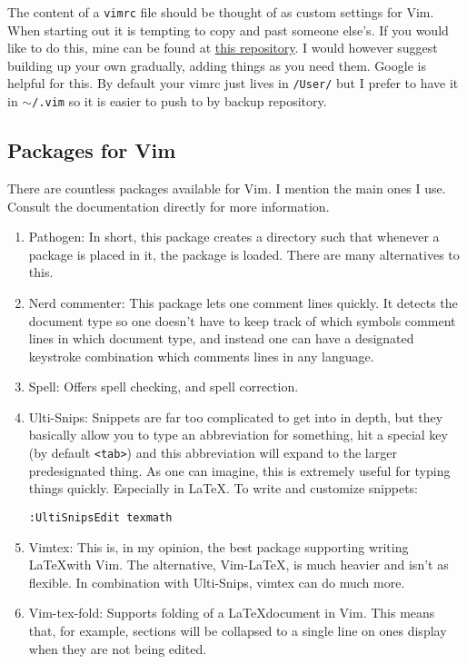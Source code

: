 \documentclass{amsart}
\begin{document}
The content of a \texttt{vimrc} file should be thought of as custom settings for Vim.
When starting out it is tempting to copy and past someone else's. If you would like to do
this, mine can be found at \href{https://github.com/jacksontvd/vim}{this repository}. I
would however suggest building up your own gradually, adding things as you need them.
Google is helpful for this. 
By default your vimrc just lives in \texttt{/User/} but I prefer to have it in 
$\sim$\texttt{/.vim} so it is easier to push to by backup repository.

\subsection{Packages for Vim}

There are countless packages available for Vim. I mention the main ones I use. Consult the
documentation directly for more information.
\begin{enumerate}
\item Pathogen: In short, this package creates a directory such that whenever a package is
placed in it, the package is loaded. There are many alternatives to this. 
\item Nerd commenter: This package lets one comment lines quickly. It detects the document
type so one doesn't have to keep track of which symbols comment lines in which document
type, and instead one can have a designated keystroke combination which comments lines in
any language. 
\item Spell: Offers spell checking, and spell correction.
\item Ulti-Snips: Snippets are far too complicated to get into in depth, but they
basically allow you to type an abbreviation for something, hit a special key (by default
\texttt{<tab>}) and this abbreviation will expand to the larger predesignated thing. As
one can imagine, this is extremely useful for typing things quickly. Especially in \LaTeX.
To write and customize snippets:
\begin{verbatim}
:UltiSnipsEdit texmath
\end{verbatim}
\item Vimtex: This is, in my opinion, the best package supporting writing \LaTeX with Vim.
The alternative, Vim-LaTeX, is much heavier and isn't as flexible. In combination with
Ulti-Snips, vimtex can do much more. 
\item Vim-tex-fold: Supports folding of a \LaTeX document in Vim. This means that, for
example, sections will be collapsed to a single line on ones display when they are not
being edited. 
\end{enumerate}
\end{document}
